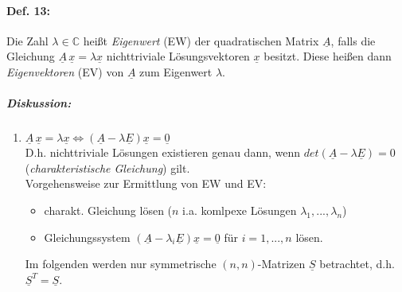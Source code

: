 \paragraph{Def. 13:} \parskp
Die Zahl $\lambda \in \mathbb{C}$ heißt \emph{Eigenwert} (EW) der quadratischen Matrix $\underline{A}$, falls die Gleichung $\boxed{\underline{A}\,\underline{x}=\lambda \underline{x}}$ nichttriviale Lösungsvektoren $\underline{x}$ besitzt. Diese heißen dann \emph{Eigenvektoren} (EV) von $\underline{A}$ zum Eigenwert $\lambda$.
\subparagraph{Diskussion:}
\begin{enumerate}
\item $\underline{A}\,\underline{x} = \lambda \underline{x} \Leftrightarrow (\underline{A}-\lambda\underline{E})\underline{x}=\underline{0}$\\
D.h. nichttriviale Lösungen existieren genau dann, wenn $\boxed{det(\underline{A}-\lambda\underline{E})=0}$ (\emph{charakteristische Gleichung}) gilt.\\
Vorgehensweise zur Ermittlung von EW und EV:
\begin{itemize}
\item charakt. Gleichung lösen ($n$ i.a. komlpexe Lösungen $\lambda_1, ..., \lambda_n$)
\item Gleichungssystem $(\underline{A}-\lambda_i\underline{E})\underline{x}=\underline{0}$ für $i=1,...,n$ lösen.
\end{itemize}
Im folgenden werden nur symmetrische $(n,n)$-Matrizen $\underline{S}$ betrachtet, d.h. $\underline{S}^T=\underline{S}$.

\end{enumerate}
